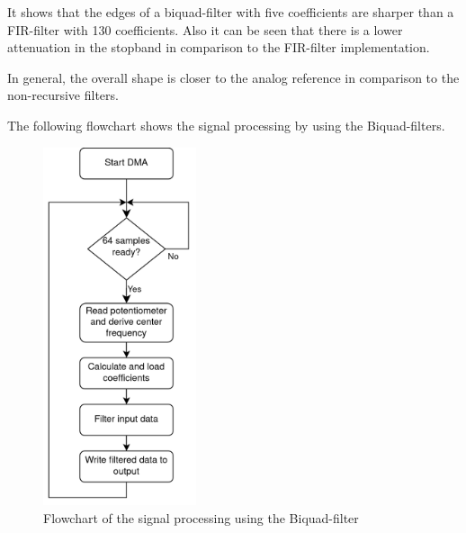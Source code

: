 It shows that the edges of a biquad-filter with five coefficients are sharper than a \ac{FIR}-filter
with 130 coefficients. Also it can be seen that there is a lower attenuation in the stopband in comparison
to the \ac{FIR}-filter implementation.

In general, the overall shape is closer to the analog reference in comparison to
the non-recursive filters.

The following flowchart shows the signal processing by using the Biquad-filters.

\begin{figure}[!h]
    \centering
    \includegraphics[width=4.5cm]{img/IIR_flowchart.png}
    \caption{Flowchart of the signal processing using the Biquad-filter}
    \label{fig:iir-flowchart}
\end{figure}

\cleardoublepage
